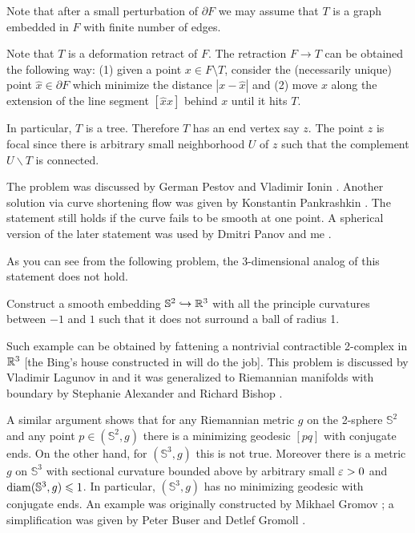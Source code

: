 \medskip

Note that after a small perturbation
of $\partial F$ we may assume that
$T$ is a graph embedded in
$F$ with finite number of edges.

Note that $T$ is a
deformation retract of $F$.
The retraction $F\to T$ can be obtained the following way:
(1) given a point $x\in F\setminus T$,
consider  the (necessarily unique) point $\hat x\in \partial F$ which minimize the distance $|x-\hat x|$ and
(2) move $x$ along the extension of the line segment $[\hat x x]$ behind $x$ until it hits $T$.

In particular, $T$ is a tree.
Therefore $T$  has
an end vertex say $z$.
The point $z$ is focal since there is arbitrary small neighborhood $U$ of $z$ such that the complement $U\backslash T$ is connected.
\qeds

The problem was discussed by German Pestov and Vladimir Ionin \cite[see][]{pestov-ionin}.
Another solution via curve shortening flow 
was given by Konstantin Pankrashkin \cite[see][]{pankrashkin}.
The statement still holds if the curve fails to be smooth at one point.
A spherical version of the later statement 
was used by Dmitri Panov and me \cite[see][]{panov-petrunin-ramification}.

As you can see from the following problem, the 3-dimensional analog of this statement does not hold.

\begin{pr}
Construct a smooth embedding $\mathbb{S}^2\hookrightarrow \mathbb{R}^3$ 
with all the principle curvatures between $-1$ and $1$
such that it does not surround a ball of radius 1.
\end{pr}

Such example can be obtained by fattening a nontrivial contractible 2-complex in $\mathbb{R}^3$ 
[the Bing's house constructed in will do the job].
This problem is discussed by Vladimir Lagunov in \cite{lagunov-2} 
and it was generalized to Riemannian manifolds with boundary by Stephanie Alexander and Richard Bishop \cite[see][]{alexander-bishop}.

A similar argument shows that for any Riemannian metric $g$ on the 2-sphere $\mathbb S^2$ 
and any point $p\in(\mathbb S^2,g)$ there is a minimizing geodesic $[pq]$ with conjugate ends.
On the other hand, for $(\mathbb S^3,g)$ this is not true.
Moreover there is a metric $g$ on $\mathbb{S}^3$ 
with sectional curvature bounded above by arbitrary small $\varepsilon>0$ and $\operatorname{\rm diam}\nolimits(\mathbb{S}^3,g)\leqslant 1$.
In particular, $(\mathbb S^3,g)$ has no minimizing geodesic with conjugate ends.
An example was originally constructed by Mikhael Gromov \cite[see][]{gromov-almost-flat}; 
a simplification was given by 
Peter Buser
and Detlef Gromoll \cite[see][]{buser-gromoll}.


